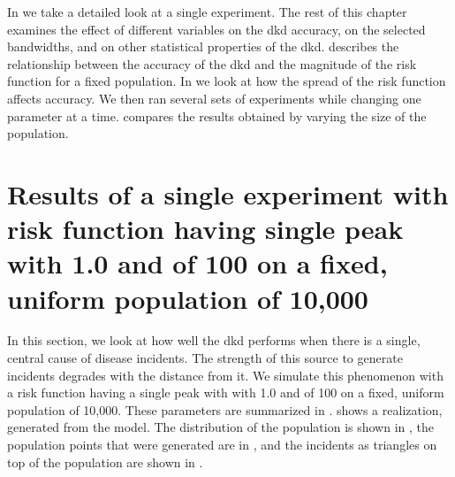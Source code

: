 In  we take a detailed look at a single experiment.
The rest of this chapter examines the effect of different variables on the \gls{dkd} accuracy, on the selected bandwidths, and on other statistical properties of the \gls{dkd}.
 describes the relationship between the accuracy of the \gls{dkd} and the magnitude of the risk function for a fixed population.
In  we look at how the spread of the risk function affects accuracy.
We then ran several sets of experiments while changing one parameter at a time.
 compares the results obtained by varying the size of the population.

\section[Results of single-peak risk on uniform population]
    {Results of a single experiment with risk function having single peak with  1.0 and  of 100 on a fixed, uniform population of 10,000}
\label{sec:results:unif_100_1.0_1h}


In this section, we look at how well the \gls{dkd} performs when there is a single, central cause of disease incidents.
The strength of this source to generate incidents degrades with the distance from it.
We simulate this phenomenon with a risk function having a single peak with with  1.0 and  of 100 on a fixed, uniform population of 10,000.
These parameters are summarized in .
 shows a realization, generated from the model.
The distribution of the population is shown in ,
the population points that were generated are in ,
and the incidents as triangles on top of the population are shown in .

